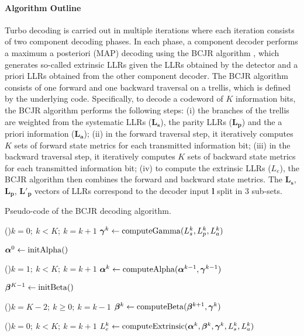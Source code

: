 \paragraph{Algorithm Outline}

Turbo decoding is carried out in multiple iterations where each iteration
consists of two component decoding phases. In each phase, a component
decoder performs a maximum a posteriori (MAP) decoding using the BCJR algorithm
\cite{Bahl1974}, which generates so-called extrinsic LLRs given the LLRs
obtained by the detector and a priori LLRs obtained from the other component
decoder. The BCJR algorithm consists of one forward and one backward traversal
on a trellis, which is defined by the underlying code. Specifically, to decode a
codeword of $K$ information bits, the BCJR algorithm performs the following
steps: (i) the branches of the trellis are weighted from the systematic LLRs
($\bm{L_s}$), the parity LLRs ($\bm{L_p}$) and the a priori information
($\bm{L_a}$); (ii) in the forward traversal step, it iteratively computes $K$
sets of forward state metrics for each transmitted information bit; (iii) in the
backward traversal step, it iteratively computes $K$ sets of backward state
metrics for each transmitted information bit; (iv) to compute the extrinsic LLRs
($L_e$), the BCJR algorithm then combines the forward and backward state
metrics. The $\bm{L_s}$, $\bm{L_p}$, $\bm{L'_p}$ vectors of LLRs correspond to
the decoder input $\bm{l}$ split in 3 sub-sets.

\begin{algorithm}
  \caption{Pseudo-code of the BCJR decoding algorithm.}
  \label{alg:ctx_turbo_bcjr}

    \For(){$k=0;~k<K;~k=k+1$}
    {
      $\boldsymbol{\gamma}^k\gets \operatorname*{computeGamma}(L_{s}^k, L_{p}^k, L_{a}^k)$
    }

    $\boldsymbol{\alpha}^0\gets \operatorname*{initAlpha}()$

    \For(){$k=1;~k<K;~k=k+1$}
    {
      $\boldsymbol{\alpha}^k\gets \operatorname*{computeAlpha}(\boldsymbol{\alpha}^{k-1}, \boldsymbol{\gamma}^{k-1})$
    }

    $\boldsymbol{\beta}^{K-1}\gets \operatorname*{initBeta}()$

    \For(){$k=K-2;~k \geq 0;~k=k-1$}
    {
      $\boldsymbol{\beta}^k\gets \operatorname*{computeBeta}(\boldsymbol{\beta}^{k+1}, \boldsymbol{\gamma}^{k})$
    }

    \For(){$k=0;~k<K;~k=k+1$}
    {
      $L_e^k\gets \operatorname*{computeExtrinsic}(\boldsymbol{\alpha}^k, \boldsymbol{\beta}^{k}, \boldsymbol{\gamma}^{k}, L_{s}^k, L_{a}^k)$
    }
\end{algorithm}

